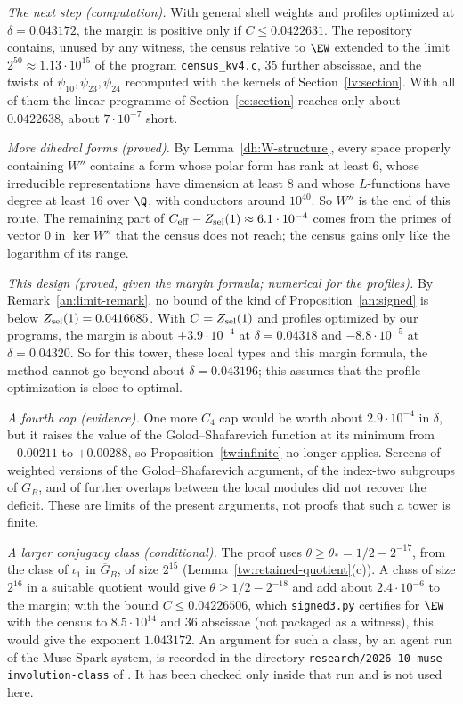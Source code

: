 \emph{The next step (computation).} With general shell weights and
profiles optimized at $\delta=0.043172$, the margin is positive only if
$C\le0.0422631$. The repository contains, unused by any witness, the census
relative to $\EW$ extended to the limit $2^{50}\approx1.13\cdot10^{15}$ of the
program \texttt{census\_kv4.c}, $35$ further abscissae, and the twists of
$\psi_{10},\psi_{23},\psi_{24}$ recomputed with the kernels of
Section~\ref{lv:section}. With all of them the linear programme of
Section~\ref{ce:section} reaches only about $0.0422638$, about $7\cdot10^{-7}$
short.

\emph{More dihedral forms (proved).} By Lemma~\ref{dh:W-structure}, every
space properly containing $W''$ contains a form whose polar form has rank at
least $6$, whose irreducible representations have dimension at least $8$ and
whose $L$-functions have degree at least $16$ over $\Q$, with conductors
around $10^{40}$. So $W''$ is the end of this route. The remaining part of
$C_{\rm eff}-Z_{\rm sel}(1)\approx6.1\cdot10^{-4}$ comes from the primes of
vector $0$ in $\ker W''$ that the census does not reach; the census gains only
like the logarithm of its range.

\emph{This design (proved, given the margin formula; numerical for the
profiles).} By Remark~\ref{an:limit-remark}, no bound of the kind of
Proposition~\ref{an:signed} is below $Z_{\rm sel}(1)=0.0416685$. With
$C=Z_{\rm sel}(1)$ and profiles optimized by our programs, the margin is about
$+3.9\cdot10^{-4}$ at $\delta=0.04318$ and $-8.8\cdot10^{-5}$ at
$\delta=0.04320$. So for this tower, these local types and this margin formula,
the method cannot go beyond about $\delta=0.043196$; this assumes that the
profile optimization is close to optimal.

\emph{A fourth cap (evidence).} One more $C_4$ cap would be worth about
$2.9\cdot10^{-4}$ in $\delta$, but it raises the value of the
Golod--Shafarevich function at its minimum from $-0.00211$ to $+0.00288$, so
Proposition~\ref{tw:infinite} no longer applies. Screens of weighted versions
of the Golod--Shafarevich argument, of the index-two subgroups of $G_B$, and
of further overlaps between the local modules did not recover the deficit.
These are limits of the present arguments, not proofs that such a tower is
finite.

\emph{A larger conjugacy class (conditional).} The proof uses
$\theta\ge\theta_*=1/2-2^{-17}$, from the class of $\iota_1$ in
$\overline G_B$, of size $2^{15}$ (Lemma~\ref{tw:retained-quotient}(c)). A class of
size $2^{16}$ in a suitable quotient would give $\theta\ge1/2-2^{-18}$ and add
about $2.4\cdot10^{-6}$ to the margin; with the bound $C\le0.04226506$, which
\texttt{signed3.py} certifies for $\EW$ with the census to $8.5\cdot10^{14}$ and
$36$ abscissae (not packaged as a witness), this would give the exponent
$1.043172$. An argument for such a class, by an agent run of the Muse Spark
system, is recorded in the directory \texttt{research/2026-10-muse-involution-class}
of \cite{NaslundCode4317}. It has been checked only inside that run and is not
used here.
